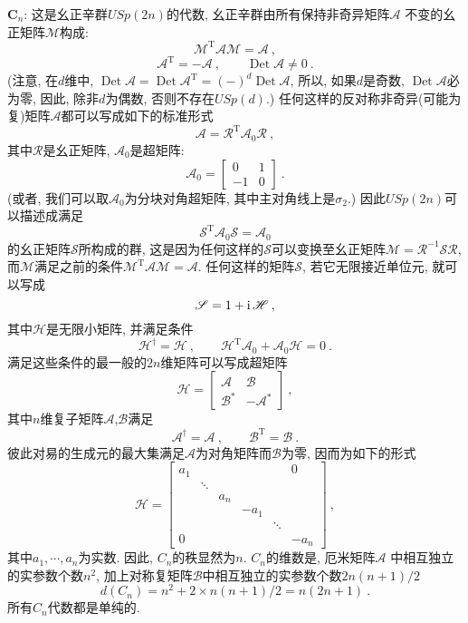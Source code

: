 \noindent$\bm{C}_{n}$: 这是幺正辛群$USp(2n)$的代数, 幺正辛群由所有保持{}非奇异矩阵$\mathscr{A}$%
不变的幺正矩阵$\mathscr{M}$构成:%
\[
\mathscr{M}^{\mathrm{T}}\mathscr{A}\mathscr{M}=\mathscr{A}\:, 
\]%
\[
\mathscr{A}^{\mathrm{T}}=-\mathscr{A} \:, \qquad \operatorname{Det} \mathscr{A} \neq 0\:. 
\]%
(注意, 在$d$维中, $\operatorname{Det} \mathscr{A}=\operatorname{Det} %
\mathscr{A}^{\mathrm{T}}=(-)^{d}\operatorname{Det} \mathscr{A}$, 所以, 如果$d$是奇数, 
$\operatorname{Det} \mathscr{A}$必为零, 因此, 除非$d$为偶数, 否则不存在$USp(d)$.) 
任何这样的反对称非奇异(可能为复)矩阵$\mathscr{A}$都可以写成如下的标准形式%
\[
\mathscr{A}=\mathscr{R}^{\mathrm{T}}\mathscr{A}_{0}\mathscr{R}\:, 
\]%
其中$\mathscr{R}$是幺正矩阵, $\mathscr{A}_{0}$是超矩阵:%
\[
\mathscr{A}_{0}=
\begin{bmatrix}
    0 & 1 \\
    -1 & 0%
\end{bmatrix}  \:. 
\]%
(或者, 我们可以取$\mathscr{A}_{0}$为分块对角超矩阵, 其中主对角线上是$\sigma_{2}$.) 因此$USp(2n)$可以描述成满足
\[
\mathscr{S}^{\mathrm{T}}\mathscr{A}_{0}\mathscr{S}=\mathscr{A}_{0}
\]%
的幺正矩阵$\mathscr{S}$所构成的群, 这是因为任何这样的$\mathscr{S}$可以变换至幺正矩阵$\mathscr{M}=\mathscr{R}^{-1}\mathscr{S}\mathscr{R}$, 而$\mathscr{M}$满足之前的条件$\mathscr{M}^{\mathrm{T}}\mathscr{A}\mathscr{M}=\mathscr{A}$. 
任何这样的矩阵$\mathscr{S}$, 若它无限接近单位元, 就可以写成
\[
\mathscr{S}=1+\mathrm{i}\,\mathscr{H}\:, 
\]%
其中$\mathscr{H}$是无限小矩阵, 并满足条件
\[
\mathscr{H}^{\dag }=\mathscr{H} \:, \qquad 
\mathscr{H}^{\mathrm{T}}\mathscr{A}_{0}+\mathscr{A}_{0}\mathscr{H}=0\:. 
\]%
满足这些条件的最一般的$2n$维矩阵可以写成超矩阵\[
\mathscr{H}=
\begin{bmatrix}
\mathscr{A} & \mathscr{B} \\
\mathscr{B}^{\ast } & -\mathscr{A}^{\ast }%
\end{bmatrix} \:, 
\]%
其中$n$维复子矩阵$\mathscr{A}$,$\mathscr{B}$满足
\[
\mathscr{A}^{\dag }=\mathscr{A} \:, \qquad \mathscr{B}^{\mathrm{T}}=\mathscr{B}\:. 
\]%
彼此对易的生成元的最大集满足$\mathscr{A}$为对角矩阵而$\mathscr{B}$为零, 因而为如下的形式
\[
\mathscr{H}=
\begin{bmatrix}
a_{1} &  &  &  &  & 0 \\
& \ddots  &  &  &  &  \\
&  & a_{n} &  &  &  \\
&  &  & -a_{1} &  &  \\
&  &  &  & \ddots  &  \\
0 &  &  &  &  & -a_{n}%
\end{bmatrix} \:,
\]%
其中$a_{1},\cdots ,a_{n}$为实数. 因此, $C_{n}$的秩显然为$n$. $C_{n}$的维数是, 厄米矩阵$\mathscr{A}$%
中相互独立的实参数个数$n^{2}$, 加上对称复矩阵$\mathscr{B}$中相互独立的实参数个数$2n(n+1)/2$%
\[
d(C_{n})=n^{2}+2\times n(n+1)/2=n(2n+1)\:. 
\]%
所有$C_{n}$代数都是单纯的.

